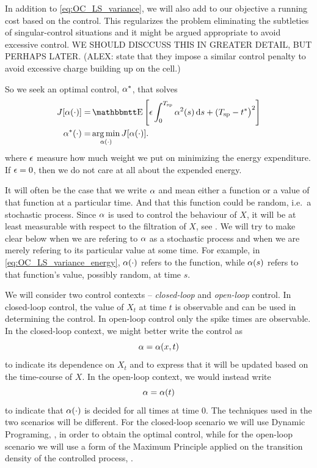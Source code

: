 \documentclass{article}
\begin{document}
In addition to \cref{eq:OC_LS_variance}, we will also add to our objective a
running cost based on the control. This regularizes the problem eliminating the
subtleties of singular-control situations and it might be argued appropriate to
avoid excessive control. WE SHOULD DISCCUSS THIS IN GREATER DETAIL, BUT PERHAPS
LATER. (ALEX:\cite{Ahmadian2011} state that they impose a similar control
penalty to avoid excessive charge building up on the cell.)

So we seek an optimal control, ${\alpha}^*$, that solves
\begin{align}
J[\a(\cdot)] =&  
\Exp\left[
\e \int_0^\ts  \a^2(s) \intd{s}
+  
(\ts - \T \big)^2 \right]  
\label{eq:OC_LS_variance_energy}   
\\ \notag
\a^*(\cdot) =& \argmin_{\a(\cdot)} J[\a(\cdot)]. 
\end{align}
where ${\epsilon}$ measure how much weight we put on minimizing the energy expenditure.
If ${\epsilon} = 0$, then we do not care at all about the expended
energy.

It will often be the case that we write ${\alpha}$ and mean either a function or a
value of that function at a particular time. And that this function could be
random, i.e.\ a stochastic process. Since ${\alpha}$ is used to control the behaviour
of $X$, it will be at least measurable with respect to the filtration of $X$,
see \cite{Krylov2008}. We will try to make clear below when we are refering to
${\alpha}$ as a stochastic process and when we are merely refering to its particular
value at some time. For example, in \cref{eq:OC_LS_variance_energy}, ${\alpha}(\cdot)$
refers to the function, while ${\alpha}(s)$ refers to that function's value, possibly
random, at time $s$.
  
We will consider two control contexts -- {\sl closed-loop} and  {\sl open-loop}
control. In closed-loop control, the value of $X_t$ at time $t$ is observable
and can be used in determining the control. In open-loop control only the spike
times are observable. In the closed-loop context, we might better write the
control as $${\alpha} = {\alpha}(x,t)$$ to indicate its dependence on $X_t$ and to express
that it will be updated based on the time-course of $X$. 
In the open-loop context, we would instead write $${\alpha} = {\alpha}(t)$$ to indicate that
${\alpha}(\cdot)$ is decided for all times at time 0. 
The techniques used in the two scenarios will be different. For the closed-loop
scenario we will use Dynamic Programing, \cite{Fleming1975}, in order to obtain
the optimal control, while for the open-loop scenario we will use a form of the
Maximum Principle applied on the transition density of the controlled process,
\cite{Ahmed1981,Borzi2012}.
\end{document}
